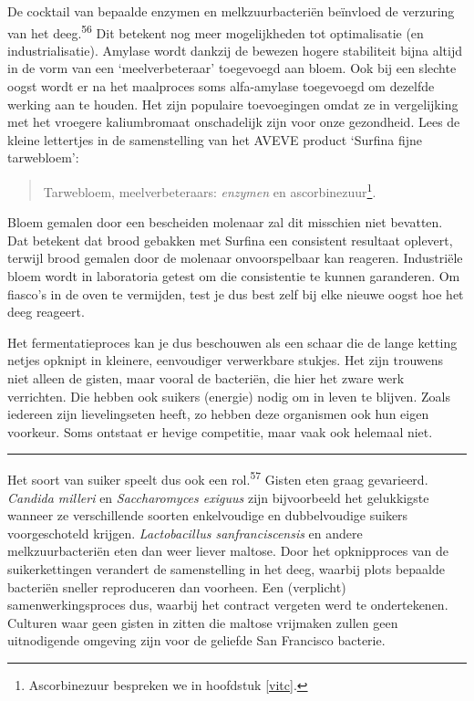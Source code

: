 \documentclass[
  11pt,
  dutch,
]{memoir}
\begin{document}
De cocktail van bepaalde enzymen en melkzuurbacteriën beïnvloed de
verzuring van het deeg.\textsuperscript{56} Dit betekent nog meer
mogelijkheden tot optimalisatie (en industrialisatie). Amylase wordt
dankzij de bewezen hogere stabiliteit bijna altijd in de vorm van een
`meelverbeteraar' toegevoegd aan bloem. Ook bij een slechte oogst wordt
er na het maalproces soms alfa-amylase toegevoegd om dezelfde werking
aan te houden. Het zijn populaire toevoegingen omdat ze in vergelijking
met het vroegere kaliumbromaat onschadelijk zijn voor onze gezondheid.
Lees de kleine lettertjes in de samenstelling van het AVEVE product
`Surfina fijne tarwebloem':

\begin{quote}
Tarwebloem, meelverbeteraars: \emph{enzymen} en
ascorbinezuur\footnote{Ascorbinezuur bespreken we in hoofdstuk
  \ref{vitc}.}.
\end{quote}

Bloem gemalen door een bescheiden molenaar zal dit misschien niet
bevatten. Dat betekent dat brood gebakken met Surfina een consistent
resultaat oplevert, terwijl brood gemalen door de molenaar
onvoorspelbaar kan reageren. Industriële bloem wordt in laboratoria
getest om die consistentie te kunnen garanderen. Om fiasco's in de oven
te vermijden, test je dus best zelf bij elke nieuwe oogst hoe het deeg
reageert.

Het fermentatieproces kan je dus beschouwen als een schaar die de lange
ketting netjes opknipt in kleinere, eenvoudiger verwerkbare stukjes. Het
zijn trouwens niet alleen de gisten, maar vooral de bacteriën, die hier
het zware werk verrichten. Die hebben ook suikers (energie) nodig om in
leven te blijven. Zoals iedereen zijn lievelingseten heeft, zo hebben
deze organismen ook hun eigen voorkeur. Soms ontstaat er hevige
competitie, maar vaak ook helemaal niet.

\pfbreak

Het soort van suiker speelt dus ook een rol.\textsuperscript{57} Gisten
eten graag gevarieerd. \emph{Candida milleri} en \emph{Saccharomyces
exiguus} zijn bijvoorbeeld het gelukkigste wanneer ze verschillende
soorten enkelvoudige en dubbelvoudige suikers voorgeschoteld krijgen.
\emph{Lactobacillus sanfranciscensis} en andere melkzuurbacteriën eten
dan weer liever maltose. Door het opknipproces van de suikerkettingen
verandert de samenstelling in het deeg, waarbij plots bepaalde bacteriën
sneller reproduceren dan voorheen. Een (verplicht) samenwerkingsproces
dus, waarbij het contract vergeten werd te ondertekenen. Culturen waar
geen gisten in zitten die maltose vrijmaken zullen geen uitnodigende
omgeving zijn voor de geliefde San Francisco bacterie.
\end{document}
